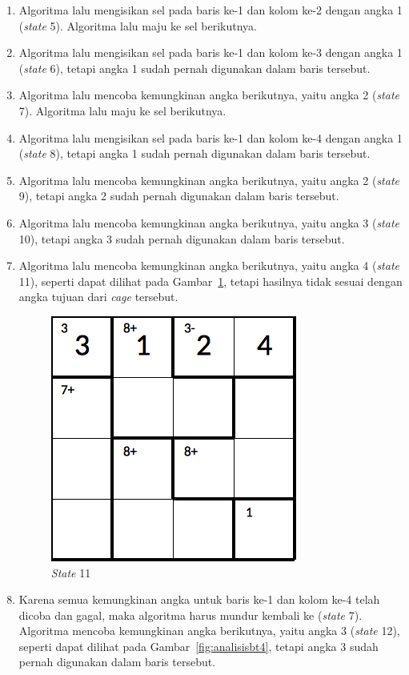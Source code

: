 \begin{enumerate}
\item Algoritma lalu mengisikan sel pada baris ke-1 dan kolom ke-2 dengan angka 1 (\textit{state} 5). Algoritma lalu maju ke sel berikutnya.
\item Algoritma lalu mengisikan sel pada baris ke-1 dan kolom ke-3 dengan angka 1 (\textit{state} 6), tetapi angka 1 sudah pernah digunakan dalam baris tersebut.
\item Algoritma lalu mencoba kemungkinan angka berikutnya, yaitu angka 2 (\textit{state} 7). Algoritma lalu maju ke sel berikutnya.
\item Algoritma lalu mengisikan sel pada baris ke-1 dan kolom ke-4 dengan angka 1 (\textit{state} 8), tetapi angka 1 sudah pernah digunakan dalam baris tersebut.
\item Algoritma lalu mencoba kemungkinan angka berikutnya, yaitu angka 2 (\textit{state} 9), tetapi angka 2 sudah pernah digunakan dalam baris tersebut.
\item Algoritma lalu mencoba kemungkinan angka berikutnya, yaitu angka 3 (\textit{state} 10), tetapi angka 3 sudah pernah digunakan dalam baris tersebut.
\item Algoritma lalu mencoba kemungkinan angka berikutnya, yaitu angka 4 (\textit{state} 11), seperti dapat dilihat pada Gambar~\ref{fig:analisisbt3}, tetapi hasilnya tidak sesuai dengan angka tujuan dari \textit{cage} tersebut.

\begin{figure}
\centering
\captionsetup{justification=centering}
\includegraphics[scale=0.333]{Gambar/backtracking/State11}
\caption[\textit{State} 11]{\textit{State} 11}
\label{fig:analisisbt3}
\end{figure}

\item Karena semua kemungkinan angka untuk baris ke-1 dan kolom ke-4 telah dicoba dan gagal, maka algoritma harus mundur kembali ke (\textit{state} 7). Algoritma mencoba kemungkinan angka berikutnya, yaitu angka 3 (\textit{state} 12), seperti dapat dilihat pada Gambar~\ref{fig:analisisbt4}, tetapi angka 3 sudah pernah digunakan dalam baris tersebut.


\end{enumerate}
